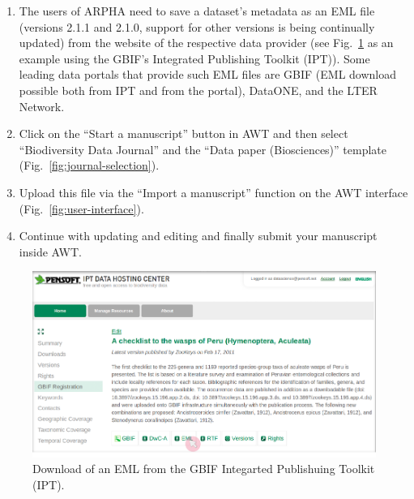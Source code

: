 \begin{enumerate}
\item{The users of ARPHA need to save a dataset's metadata as an EML file (versions 2.1.1 and 2.1.0, support for other versions is being continually updated) from the website of the respective data provider (see Fig.~\ref{fig:EML-download} as an example using the GBIF's Integrated Publishing Toolkit (IPT)). Some leading data portals that provide such EML files are GBIF (EML download possible both from IPT and from the portal), DataONE, and the LTER Network.}
\item{Click on the ``Start a manuscript'' button in AWT and then select ``Biodiversity Data Journal'' and the ``Data paper (Biosciences)'' template (Fig.~\ref{fig:journal-selection}).}
\item{Upload this file via the ``Import a manuscript'' function on the AWT interface (Fig.~\ref{fig:user-interface}).}
\item{Continue with updating and editing and finally submit your manuscript inside AWT.}
\end{enumerate}

\begin{figure}
\centering
\includegraphics[width=\textwidth]{Figures/EML-download}
\decoRule
\caption{Download of an EML from the GBIF Integarted Publishuing Toolkit (IPT).}
\label{fig:EML-download}
\end{figure}

